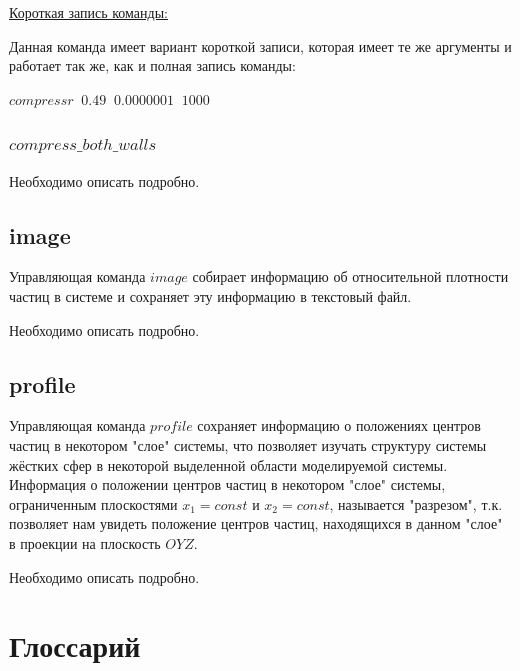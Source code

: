 \documentclass{article}
\begin{document}
\uline{Короткая запись команды:}

Данная команда имеет вариант короткой записи, которая имеет те же аргументы и работает так же, как и полная запись команды:

$ compressr \;\; 0.49 \;\; 0.0000001 \;\; 1000 $


\subsubsection{$ compress\_both\_walls $}
Необходимо описать подробно.

\subsection{image}

Управляющая команда $ image $ собирает информацию об относительной плотности частиц в системе и сохраняет эту информацию в текстовый файл.

Необходимо описать подробно.


\subsection{profile}

Управляющая команда $ profile $ сохраняет информацию о положениях центров частиц в некотором "слое" системы, что позволяет изучать структуру системы жёстких сфер в некоторой выделенной области моделируемой системы. Информация о положении центров частиц в некотором "слое" системы, ограниченным плоскостями $ x_1 = const $ и $ x_2 = const $, называется "разрезом", т.к. позволяет нам увидеть положение центров частиц, находящихся в данном "слое" в проекции на плоскость $ OYZ $.

Необходимо описать подробно.

\newpage
\section{Глоссарий}

\newpage


\end{document}
